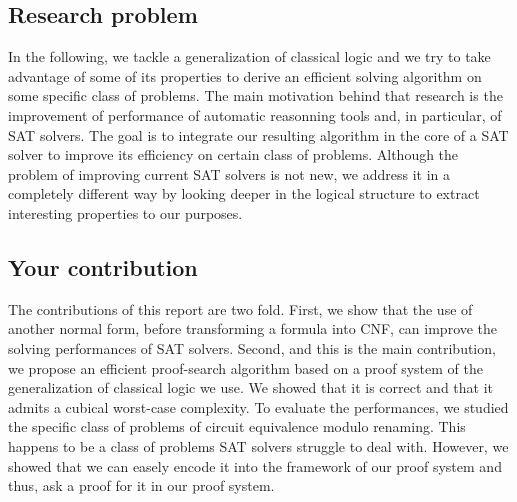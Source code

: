 \documentclass[a4paper, 11pt]{article}
\begin{document}
	\subsection*{Research problem}
	In the following, we tackle a generalization of classical logic and we try to take advantage of
	some of its properties to derive an efficient solving algorithm on some specific class of 
	problems. The main motivation behind that research is the improvement of performance of
	automatic reasonning tools and, in particular, of SAT solvers. The goal is to integrate our
	resulting algorithm in the core of a SAT solver to improve its efficiency on certain class of
	problems. Although the problem of improving current SAT solvers is not new, we address it in a
	completely different way by looking deeper in the logical structure to extract interesting
	properties to our purposes.


	\subsection*{Your contribution}
	The contributions of this report are two fold. First, we show that the use of another normal
	form, before transforming a formula into CNF, can improve the solving performances of SAT 
	solvers.
	Second, and this is the main contribution, we propose an efficient proof-search algorithm based 
	on a proof system of the generalization of classical logic we use. We showed that it is correct 
	and that it admits a cubical worst-case complexity. To evaluate the performances, we studied the 
	specific class of problems of circuit
	equivalence modulo renaming. This happens to be a class of problems SAT solvers struggle to 
	deal with.
	However, we showed that we can easely encode it into the framework of our proof system and 
	thus, ask a proof for it in our proof system.


\end{document}
